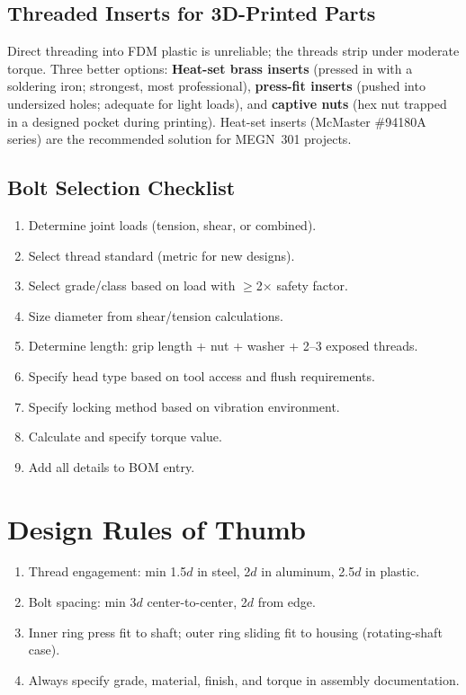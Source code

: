\subsection{Threaded Inserts for 3D-Printed Parts}
Direct threading into FDM plastic is unreliable; the threads strip under moderate torque. Three better options: \textbf{Heat-set brass inserts} (pressed in with a soldering iron; strongest, most professional), \textbf{press-fit inserts} (pushed into undersized holes; adequate for light loads), and \textbf{captive nuts} (hex nut trapped in a designed pocket during printing). Heat-set inserts (McMaster \#94180A series) are the recommended solution for MEGN~301 projects.

\subsection{Bolt Selection Checklist}
\begin{enumerate}[nosep,leftmargin=1.5em]
\item Determine joint loads (tension, shear, or combined).
\item Select thread standard (metric for new designs).
\item Select grade/class based on load with $\geq$2$\times$ safety factor.
\item Size diameter from shear/tension calculations.
\item Determine length: grip length + nut + washer + 2--3 exposed threads.
\item Specify head type based on tool access and flush requirements.
\item Specify locking method based on vibration environment.
\item Calculate and specify torque value.
\item Add all details to BOM entry.
\end{enumerate}

\section{Design Rules of Thumb}
\begin{enumerate}[leftmargin=1.5em]
\item Thread engagement: min 1.5$d$ in steel, 2$d$ in aluminum, 2.5$d$ in plastic.
\item Bolt spacing: min 3$d$ center-to-center, 2$d$ from edge.
\item Inner ring press fit to shaft; outer ring sliding fit to housing (rotating-shaft case).
\item Always specify grade, material, finish, and torque in assembly documentation.
\end{enumerate}


